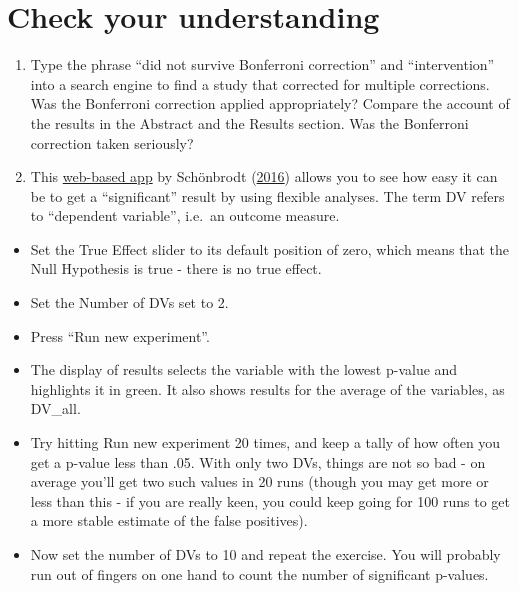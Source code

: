 \documentclass{krantz}
\begin{document}
\hypertarget{check-your-understanding-13}{%
\section{Check your understanding}\label{check-your-understanding-13}}

\begin{enumerate}
\def\labelenumi{\arabic{enumi}.}
\item
  Type the phrase ``did not survive Bonferroni correction'' and ``intervention'' into a search engine to find a study that corrected for multiple corrections. Was the Bonferroni correction applied appropriately? Compare the account of the results in the Abstract and the Results section. Was the Bonferroni correction taken seriously?
\item
  This \href{https://www.shinyapps.org/apps/p-hacker/}{web-based app} by Schönbrodt (\protect\hyperlink{ref-schonbrodt2016}{2016}) allows you to see how easy it can be to get a ``significant'' result by using flexible analyses. The term DV refers to ``dependent variable'', i.e.~an outcome measure.\\
\end{enumerate}

\begin{itemize}
\item
  Set the True Effect slider to its default position of zero, which means that the Null Hypothesis is true - there is no true effect.\\
\item
  Set the Number of DVs set to 2.\\
\item
  Press ``Run new experiment''.\\
\item
  The display of results selects the variable with the lowest p-value and highlights it in green. It also shows results for the average of the variables, as DV\_all.
\item
  Try hitting Run new experiment 20 times, and keep a tally of how often you get a p-value less than .05. With only two DVs, things are not so bad - on average you'll get two such values in 20 runs (though you may get more or less than this - if you are really keen, you could keep going for 100 runs to get a more stable estimate of the false positives).\\
\item
  Now set the number of DVs to 10 and repeat the exercise. You will probably run out of fingers on one hand to count the number of significant p-values.
\end{itemize}
\end{document}
